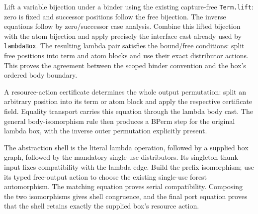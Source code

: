 Lift a variable bijection under a binder using the existing capture-free
\texttt{Term.lift}: zero is fixed and successor positions follow the free
bijection. The inverse equations follow by zero/successor case analysis. Combine
this lifted bijection with the atom bijection and apply precisely the interface
cast already used by \texttt{lambdaBox}. The resulting lambda pair satisfies the
bound/free conditions: split free positions into term and atom blocks and use
their exact distributor actions. This proves the agreement between the scoped
binder convention and the box's ordered body boundary.




A resource-action certificate determines the whole output permutation:
split an arbitrary position into its term or atom block and apply the respective
certificate field. Equality transport carries this equation through the lambda
body cast. The general body-isomorphism rule then produces a BPerm step for the
original lambda box, with the inverse outer permutation explicitly present.




The abstraction shell is the literal lambda operation, followed by a
supplied box graph, followed by the mandatory single-use distributors. Its
singleton thunk input fixes compatibility with the lambda edge. Build the prefix
isomorphism; use its typed free-output action to choose the existing single-use
forest automorphism. The matching equation proves serial compatibility. Composing
the two isomorphisms gives shell congruence, and the final port equation proves
that the shell retains exactly the supplied box's resource action.



